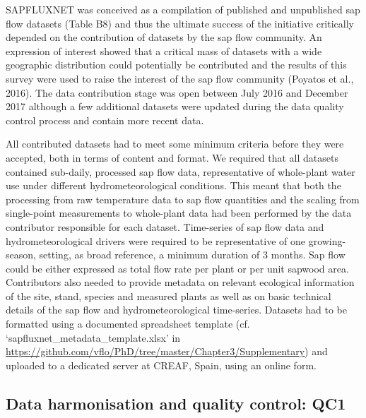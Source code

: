 \documentclass[11pt,twoside]{reedthesis}
\begin{document}
SAPFLUXNET was conceived as a compilation of published and unpublished
sap flow datasets (Table B8) and thus the ultimate success of the
initiative critically depended on the contribution of datasets by the
sap flow community. An expression of interest showed that a critical
mass of datasets with a wide geographic distribution could potentially
be contributed and the results of this survey were used to raise the
interest of the sap flow community (Poyatos et al., 2016). The data
contribution stage was open between July 2016 and December 2017 although
a few additional datasets were updated during the data quality control
process and contain more recent data. \par

All contributed datasets had to meet some minimum criteria before they
were accepted, both in terms of content and format. We required that all
datasets contained sub-daily, processed sap flow data, representative of
whole-plant water use under different hydrometeorological conditions.
This meant that both the processing from raw temperature data to sap
flow quantities and the scaling from single-point measurements to
whole-plant data had been performed by the data contributor responsible
for each dataset. Time-series of sap flow data and hydrometeorological
drivers were required to be representative of one growing-season,
setting, as broad reference, a minimum duration of 3 months. Sap flow
could be either expressed as total flow rate per plant or per unit
sapwood area. Contributors also needed to provide metadata on relevant
ecological information of the site, stand, species and measured plants
as well as on basic technical details of the sap flow and
hydrometeorological time-series. Datasets had to be formatted using a
documented spreadsheet template (cf.
`sapfluxnet\_metadata\_template.xlsx' in
\url{https://github.com/vflo/PhD/tree/master/Chapter3/Supplementary})
and uploaded to a dedicated server at CREAF, Spain, using an online
form.\par

\subsection{Data harmonisation and quality control:
QC1}\label{data-harmonisation-and-quality-control-qc1}
\end{document}
